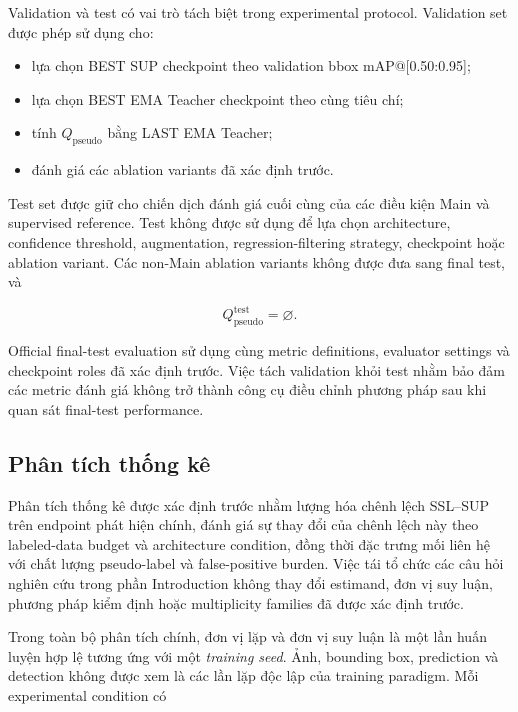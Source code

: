 \documentclass[pdflatex,sn-mathphys-num]{sn-jnl}%
\theoremstyle{thmstyleone}%
\theoremstyle{thmstyletwo}%
\theoremstyle{thmstylethree}%
\begin{document}
Validation và test có vai trò tách biệt trong experimental protocol.
Validation set được phép sử dụng cho:

\begin{itemize}
    \item lựa chọn BEST SUP checkpoint theo validation bbox
    mAP@[0.50:0.95];
    \item lựa chọn BEST EMA Teacher checkpoint theo cùng tiêu chí;
    \item tính \(Q_{\mathrm{pseudo}}\) bằng LAST EMA Teacher;
    \item đánh giá các ablation variants đã xác định trước.
\end{itemize}

Test set được giữ cho chiến dịch đánh giá cuối cùng của các điều kiện Main
và supervised reference. Test không được sử dụng để lựa chọn architecture,
confidence threshold, augmentation, regression-filtering strategy,
checkpoint hoặc ablation variant. Các non-Main ablation variants không
được đưa sang final test, và

\begin{equation}
Q_{\mathrm{pseudo}}^{\mathrm{test}}
=
\varnothing.
\label{eq:no_test_qpseudo}
\end{equation}

Official final-test evaluation sử dụng cùng metric definitions, evaluator
settings và checkpoint roles đã xác định trước. Việc tách validation khỏi
test nhằm bảo đảm các metric đánh giá không trở thành công cụ điều chỉnh
phương pháp sau khi quan sát final-test performance.

\subsection{Phân tích thống kê}
\label{subsec:statistical_analysis}

Phân tích thống kê được xác định trước nhằm lượng hóa chênh lệch SSL--SUP trên endpoint phát hiện chính,
đánh giá sự thay đổi của chênh lệch này theo labeled-data budget và
architecture condition, đồng thời đặc trưng mối liên hệ với chất lượng
pseudo-label và false-positive burden. Việc tái tổ chức các câu hỏi nghiên
cứu trong phần Introduction không thay đổi estimand, đơn vị suy luận,
phương pháp kiểm định hoặc multiplicity families đã được xác định trước.

Trong toàn bộ phân tích chính, đơn vị lặp và đơn vị suy luận là một lần
huấn luyện hợp lệ tương ứng với một \textit{training seed}. Ảnh, bounding
box, prediction và detection không được xem là các lần lặp độc lập của
training paradigm. Mỗi experimental condition có
\end{document}
